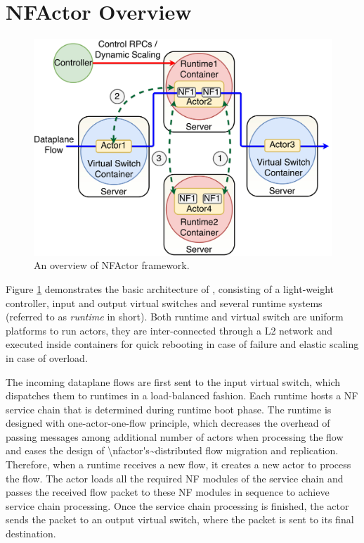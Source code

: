 \section {NFActor Overview}

\begin{figure}[!t]
  \centering
  \includegraphics[width=\columnwidth]{figure/final-final-nfactor-cluster.pdf}
  \caption{An overview of NFActor framework.}
  \label{fig:runtime}
\end{figure}

Figure \ref{fig:runtime} demonstrates the basic architecture of \nfactor, consisting of a light-weight controller, input and output virtual switches and several runtime systems (referred to as \textit{runtime} in short). \ac{Both runtime and virtual switch are uniform platforms to run actors, they are inter-connected through a L2 network and executed inside containers for quick rebooting in case of failure and elastic scaling in case of overload.} 


The incoming dataplane flows are first sent to the input virtual switch, which dispatches them to runtimes in a load-balanced fashion. \ac{Each runtime hosts a NF service chain that is determined during runtime boot phase. The runtime is designed with one-actor-one-flow principle, which decreases the overhead of passing messages among additional number of actors when processing the flow and eases the design of \nfactor's~distributed flow migration and replication.}   Therefore, when a runtime receives a new flow, it creates a new actor to process the flow. The actor loads all the required NF modules of the service chain and passes the received flow packet to these NF modules in sequence to achieve service chain processing. Once the service chain processing is finished, the actor sends the packet to an output virtual switch, where the packet is sent to its final destination.

